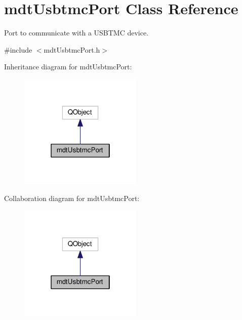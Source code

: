 \hypertarget{classmdt_usbtmc_port}{\section{mdt\-Usbtmc\-Port Class Reference}
\label{classmdt_usbtmc_port}
}


Port to communicate with a U\-S\-B\-T\-M\-C device.  




{\ttfamily \#include $<$mdt\-Usbtmc\-Port.\-h$>$}



Inheritance diagram for mdt\-Usbtmc\-Port\-:
\nopagebreak
\begin{figure}[H]
\begin{center}
\leavevmode
\includegraphics[width=166pt]{classmdt_usbtmc_port__inherit__graph}
\end{center}
\end{figure}


Collaboration diagram for mdt\-Usbtmc\-Port\-:
\nopagebreak
\begin{figure}[H]
\begin{center}
\leavevmode
\includegraphics[width=166pt]{classmdt_usbtmc_port__coll__graph}
\end{center}
\end{figure}
